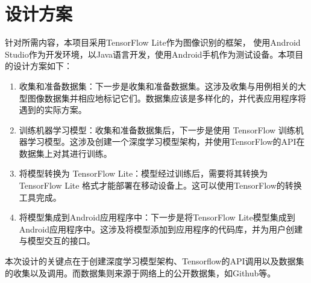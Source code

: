 %
%
%
%

\section{设计方案}
针对所需内容，本项目采用TensorFlow Lite作为图像识别的框架，
使用Android Studio作为开发环境，以Java语言开发，使用Android手机作为测试设备。本项目的设计方案如下：
\begin{enumerate}
    \item 收集和准备数据集：下一步是收集和准备数据集。这涉及收集与用例相关的大型图像数据集并相应地标记它们。数据集应该是多样化的，并代表应用程序将遇到的实际方案。
    \item 训练机器学习模型：收集和准备数据集后，下一步是使用 TensorFlow 训练机器学习模型。这涉及创建一个深度学习模型架构，并使用TensorFlow的API在数据集上对其进行训练。
    \item 将模型转换为 TensorFlow Lite：模型经过训练后，需要将其转换为 TensorFlow Lite 格式才能部署在移动设备上。这可以使用TensorFlow的转换工具完成。
    \item 将模型集成到Android应用程序中：下一步是将TensorFlow Lite模型集成到Android应用程序中。这涉及将模型添加到应用程序的代码库，并为用户创建与模型交互的接口。
\end{enumerate}
本次设计的关键点在于创建深度学习模型架构、Tensorflow的API调用以及数据集的收集以及调用。而数据集则来源于网络上的公开数据集，如Github等。
